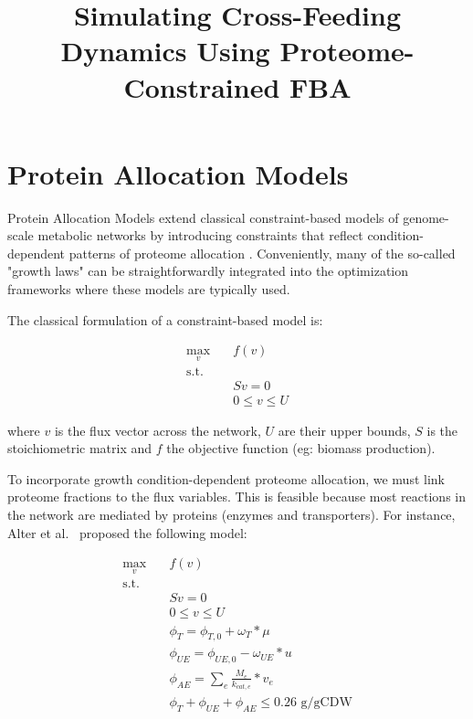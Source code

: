 \documentclass[11pt, letterpaper]{article}
\title{\textbf{Simulating Cross-Feeding Dynamics Using Proteome-Constrained FBA}}
\date{}
\author{
}
\begin{document}
\maketitle



\section{Protein Allocation Models}

Protein Allocation Models extend classical constraint-based models of genome-scale metabolic networks by introducing constraints that reflect condition-dependent patterns of proteome allocation \cite{moriConstrainedAllocationFlux2016, alterProteomeRegulationPatterns2021}.
Conveniently, many of the so-called "growth laws" \cite{scottBacterialGrowthLaws2011} can be straightforwardly integrated into the optimization frameworks where these models are typically used. 

The classical formulation of a constraint-based model is:

\begin{align*}
  \max_{v} \quad & f(v) \\
  \text{s.t.} \quad & \\ 
  & Sv = 0 \\
  & 0 \leq v \leq U
\end{align*}

where $v$ is the flux vector across the network, $U$ are their upper bounds, $S$ is the stoichiometric matrix and $f$ the objective function (eg: biomass production). 

To incorporate growth condition-dependent proteome allocation, we must link proteome fractions to the flux variables.
This is feasible because most reactions in the network are mediated by proteins (enzymes and transporters).
For instance, Alter et al.~\cite{alterProteomeRegulationPatterns2021} proposed the following model:

\begin{align*} 
\max_{v} \quad & f(v) \\
\text{s.t.} \quad & \\ 
& Sv = 0 \\
& 0 \leq v \leq U \\
& \phi_{T} = \phi_{T, 0} + \omega_{T} * \mu \\
& \phi_{UE} = \phi_{UE, 0} - \omega_{UE} * u \\
& \phi_{AE} = \sum_{e} \frac{M_e}{k_{cat, e}}  * v_e \\
& \phi_{T} + \phi_{UE} + \phi_{AE} \le 0.26 \text{ g/gCDW}
\end{align*}
\end{document}
